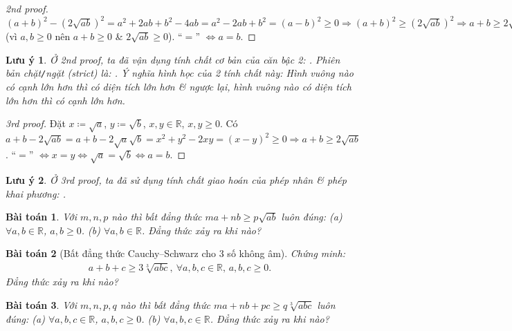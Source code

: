 \documentclass{article}
\newtheorem{baitoan}{Bài toán}
\newtheorem{luuy}{Lưu ý}
\begin{document}
\begin{proof}[2nd proof]
	$(a + b)^2 - (2\sqrt{ab})^2 = a^2 + 2ab + b^2 - 4ab = a^2 - 2ab + b^2 = (a - b)^2\ge0\Rightarrow(a + b)^2\ge(2\sqrt{ab})^2\Rightarrow a + b\ge2\sqrt{ab}$ (vì $a,b\ge0$ nên $a + b\ge0$ \& $2\sqrt{ab}\ge0$). ``$=$'' $\Leftrightarrow a = b$.
\end{proof}

\begin{luuy}
	Ở 2nd proof, ta đã vận dụng tính chất cơ bản của căn bậc 2: . Phiên bản chặt\emph{\texttt{/}}ngặt (strict) là: . Ý nghĩa hình học của 2 tính chất này: Hình vuông nào có cạnh lớn hơn thì có diện tích lớn hơn \& ngược lại, hình vuông nào có diện tích lớn hơn thì có cạnh lớn hơn.
\end{luuy}

\begin{proof}[3rd proof]
	Đặt $x\coloneqq\sqrt{a}$, $y\coloneqq\sqrt{b}$, $x,y\in\mathbb{R}$, $x,y\ge0$. Có $a + b - 2\sqrt{ab} = a + b - 2\sqrt{a}\sqrt{b} = x^2 + y^2 - 2xy = (x - y)^2\ge0\Rightarrow a + b\ge2\sqrt{ab}$. ``$=$'' $\Leftrightarrow x = y\Leftrightarrow\sqrt{a} = \sqrt{b}\Leftrightarrow a = b$.
\end{proof}

\begin{luuy}
	Ở 3rd proof, ta đã sử dụng tính chất giao hoán của phép nhân \& phép khai phương: .
\end{luuy}

\begin{baitoan}
	Với $m,n,p$ nào thì bất đẳng thức $ma + nb\ge p\sqrt{ab}$ luôn đúng: (a) $\forall a,b\in\mathbb{R}$, $a,b\ge0$. (b) $\forall a,b\in\mathbb{R}$. Đẳng thức xảy ra khi nào?
\end{baitoan}

\begin{baitoan}[Bất đẳng thức Cauchy--Schwarz cho 3 số không âm]
	Chứng minh:
	\begin{align*}
		\boxed{a + b + c\ge3\sqrt[3]{abc},\ \forall a,b,c\in\mathbb{R},\,a,b,c\ge 0.}
	\end{align*}
	Đẳng thức xảy ra khi nào?
\end{baitoan}

\begin{baitoan}
	Với $m,n,p,q$ nào thì bất đẳng thức $ma + nb + pc\ge q\sqrt[3]{abc}$ luôn đúng: (a) $\forall a,b,c\in\mathbb{R}$, $a,b,c\ge0$. (b) $\forall a,b,c\in\mathbb{R}$. Đẳng thức xảy ra khi nào?
\end{baitoan}
\end{document}
